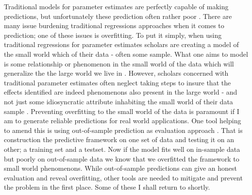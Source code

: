 \documentclass[a4paper]{article}
\begin{document}
Traditional models for parameter estimates are perfectly capable of making predictions, but unfortunately these prediction often rather poor \citep{Ward_Greenhill_Bakke_2010}. There are many issue burdening traditional regressions approaches when it comes to prediction; one of these issues is overfitting. To put it simply, when using traditional regressions for parameter estimates scholars are creating a model of the small world which of their data - often some sample. What one aims to model is some relationship or phenomenon in the small world of the data which will generalize the the large world we live in \citep{Mcelreath_2018}. However, scholars concerned with traditional parameter estimates often neglect taking steps to insure that the effects identified are indeed phenomenons also present in the large world - and not just some idiosyncratic attribute inhabiting the small world of their data sample \citep{Ward_Greenhill_Bakke_2010, Mcelreath_2018}. Preventing overfitting to the small world of the data is paramount if I am to generate reliable predictions for real world applications. One tool helping to amend this is using out-of-sample prediction as evaluation approach \citep{Ward_Greenhill_Bakke_2010, perry_2013}. That is construction the predictive framework on one set of data and testing it on an other; a training set and a testset. Now if the model fits well on in-sample data but poorly on out-of-sample data we know that we overfitted the framework to small world phenomenons. While out-of-sample predictions can give an honest evaluation and reveal overfitting, other tools are needed to mitigate and prevent the problem in the first place. Some of these I shall return to shortly.\par
\end{document}
